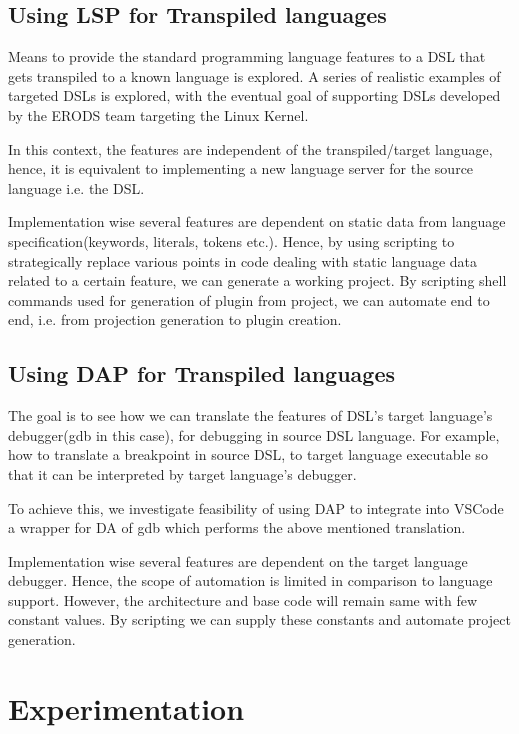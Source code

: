 \documentclass[dvipsnames]{article}
\begin{document}
\subsection{Using LSP for Transpiled languages}

Means to provide the standard programming language features to a DSL that gets transpiled to a known language is explored.
A series of realistic examples of targeted DSLs is explored, with the eventual goal of supporting DSLs developed by the ERODS team targeting the Linux Kernel.

In this context, the features are independent of the transpiled/target language, hence, it is equivalent to implementing a new language server for the source language i.e. the DSL.

Implementation wise several features are dependent on static data from language specification(keywords, literals, tokens etc.).
Hence, by using scripting to strategically replace various points in code dealing with static language data related to a certain feature, we can generate a working project.
By scripting shell commands used for generation of plugin from project, we can automate end to end, i.e. from projection generation to plugin creation.

\subsection{Using DAP for Transpiled languages}

The goal is to see how we can translate the features of DSL's target language's debugger(gdb in this case), for debugging in source DSL language.
For example, how to translate a breakpoint in source DSL, to target language executable so that it can be interpreted by target language's debugger.

To achieve this, we investigate feasibility of using DAP to integrate into VSCode a wrapper for DA of gdb which performs the above mentioned translation.

Implementation wise several features are dependent on the target language debugger.
Hence, the scope of automation is limited in comparison to language support.
However, the architecture and base code will remain same with few constant values.
By scripting we can supply these constants and automate project generation.

\section{Experimentation}
\end{document}
